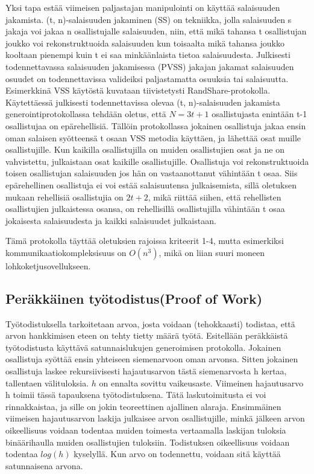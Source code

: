 \documentclass{article}
\begin{document}
Yksi tapa estää viimeisen paljastajan manipulointi on käyttää salaisuuden jakamista. (t, n)-salaisuuden jakaminen (SS) on tekniikka, jolla salaisuuden s jakaja voi jakaa n osallistujalle salaisuuden, niin, että mikä tahansa t osallistujan joukko voi rekonstruktuoida salaisuuden kun toisaalta mikä tahansa joukko kooltaan pienempi kuin t ei saa minkäänlaista tietoa salaisuudesta\cite{syta_scalable_2017}. Julkisesti todennettavassa salaisuuden jakamisessa (PVSS) jakajan jakamat salaisuuden osuudet on todennettavissa valideiksi paljastamatta osuuksia tai salaisuutta. Esimerkkinä VSS käytöstä kuvataan tiivistetysti RandShare-protokolla\cite{syta_scalable_2017}. Käytettäessä julkisesti todennettavissa olevaa (t, n)-salaisuuden jakamista generointiprotokollassa tehdään oletus, että $N = 3t+1$ osallistujasta enintään t-1 osallistujaa on epärehellisiä. Tällöin protokollassa jokainen osallistuja jakaa ensin oman salaisen syötteensä t osaan VSS metodia käyttäen, ja lähettää osat muille osallistujille. Kun kaikilla osallistujilla on muiden osallistujien osat ja ne on vahvistettu, julkaistaan osat kaikille osallistujille. Osallistuja voi rekonstruktuoida toisen osallistujan salaisuuden jos hän on vastaanottanut vähintään t osaa. Siis epärehellinen osallistuja ei voi estää salaisuutensa julkaisemista, sillä oletuksen mukaan rehellisiä osallistujia on $2t+2$, mikä riittää siihen, että rehellisten osallistujien julkaistessa osansa, on rehellisillä osallistujilla vähintään t osaa jokaisesta salaisuudesta ja kaikki salaisuudet julkaistaan. 

Tämä protokolla täyttää oletuksien rajoissa kriteerit 1-4, mutta esimerkiksi kommunikaatiokompleksisuus on $O(n^3)$\cite{syta_scalable_2017}, mikä on liian suuri moneen lohkoketjusovellukseen.

\subsection{Peräkkäinen työtodistus(Proof of Work)}
Työtodistuksella tarkoitetaan arvoa, josta voidaan (tehokkaasti) todistaa, että arvon hankkimisen eteen on tehty tietty määrä työtä. Esitellään peräkkäistä työtodistusta käyttävä satunnaislukujen generoimisen protokolla\cite{lesaege_kleros_2020}. Jokainen osallistuja syöttää ensin yhteiseen siemenarvoon oman arvonsa. Sitten jokainen osallistuja laskee rekursiivisesti hajautusarvon tästä siemenarvosta h kertaa, tallentaen välituloksia. $h$ on ennalta sovittu vaikeusaste. Viimeinen hajautusarvo h toimii tässä tapauksena työtodistuksena. Tätä laskutoimitusta ei voi rinnakkaistaa, ja sille on jokin teoreettinen ajallinen alaraja. Ensimmäinen viimeisen hajautusarvon laskija julkaisee arvon osallistujille, minkä jälkeen arvon oikeellisuus voidaan todentaa muiden toimesta vertaamalla laskijan tuloksia binäärihaulla muiden osallistujien tuloksiin. Todistuksen oikeellisuus voidaan todentaa $log(h)$ kyselyllä. Kun arvo on todennettu, voidaan sitä käyttää satunnaisena arvona.
\end{document}
